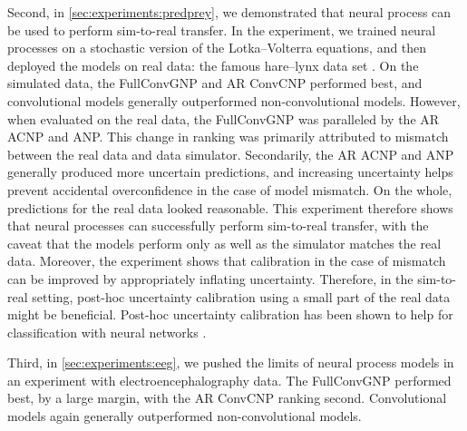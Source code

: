 \documentclass[12pt, twoside]{report}
\begin{document}
Second, in \cref{sec:experiments:predprey}, we demonstrated that neural process can be used to perform sim-to-real transfer.
In the experiment, we trained neural processes on a stochastic version of the Lotka--Volterra equations, and then deployed the models on real data: the famous hare--lynx data set \parencite{MacLulich:1937:Fluctuations_in_the_Numbers_of_the_Varying_Hare}.
On the simulated data, the FullConvGNP and AR ConvCNP performed best,
and convolutional models generally outperformed non-convolutional models.
However, when evaluated on the real data, the FullConvGNP was paralleled by the AR ACNP and ANP.
This change in ranking was primarily attributed to mismatch between the real data and data simulator.
Secondarily, the AR ACNP and ANP generally produced more uncertain predictions,
and increasing uncertainty helps prevent accidental overconfidence in the case of model mismatch.
On the whole, predictions for the real data looked reasonable.
This experiment therefore shows that neural processes can successfully perform sim-to-real transfer,
with the caveat that the models perform only as well as the simulator matches the real data.
Moreover, the experiment shows that calibration in the case of mismatch can be improved by appropriately inflating uncertainty.
Therefore, in the sim-to-real setting,
post-hoc uncertainty calibration using a small part of the real data might be beneficial.
Post-hoc uncertainty calibration has been shown to help for classification with neural networks \parencite{Guo:2017:On_Calibration_of_Modern_Neural,Tomani:2021:Post-Hoc_Uncertainty_Calibration_for_Domain}.


Third, in \cref{sec:experiments:eeg}, we pushed the limits of neural process models in an experiment with electroencephalography data.
The FullConvGNP performed best, by a large margin, with the AR ConvCNP ranking second.
Convolutional models again generally outperformed non-convolutional models.
\end{document}
